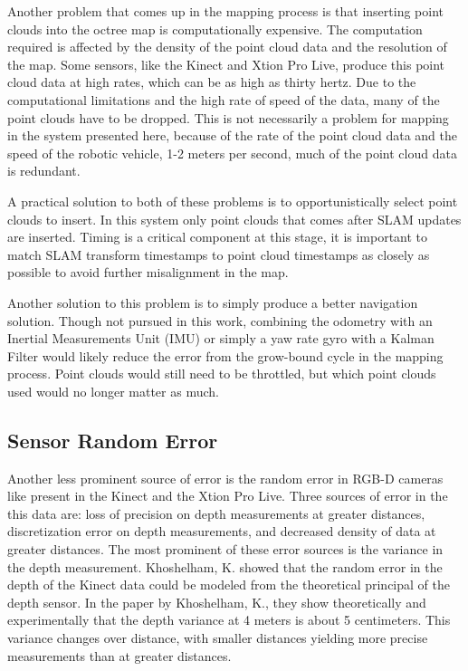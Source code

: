 \documentclass[12pt]{report}
\begin{document}
Another problem that comes up in the mapping process is that inserting point clouds into the octree map is computationally expensive.  The computation required is affected by the density of the point cloud data and the resolution of the map.  Some sensors, like the Kinect and Xtion Pro Live, produce this point cloud data at high rates, which can be as high as thirty hertz.  Due to the computational limitations and the high rate of speed of the data, many of the point clouds have to be dropped.  This is not necessarily a problem for mapping in the system presented here, because of the rate of the point cloud data and the speed of the robotic vehicle, 1-2 meters per second, much of the point cloud data is redundant.

A practical solution to both of these problems is to opportunistically select point clouds to insert.  In this system only point clouds that comes after SLAM updates are inserted.  Timing is a critical component at this stage, it is important to match SLAM transform timestamps to point cloud timestamps as closely as possible to avoid further misalignment in the map.

Another solution to this problem is to simply produce a better navigation solution.  Though not pursued in this work, combining the odometry with an Inertial Measurements Unit (IMU) or simply a yaw rate gyro with a Kalman Filter would likely reduce the error from the grow-bound cycle in the mapping process.  Point clouds would still need to be throttled, but which point clouds used would no longer matter as much.

\subsection{Sensor Random Error}
Another less prominent source of error is the random error in RGB-D cameras like present in the Kinect and the Xtion Pro Live.  Three sources of error in the this data are: loss of precision on depth measurements at greater distances, discretization error on depth measurements, and decreased density of data at greater distances.  The most prominent of these error sources is the variance in the depth measurement.  Khoshelham, K. showed that the random error in the depth of the Kinect data could be modeled from the theoretical principal of the depth sensor\cite{khoshelham2011accuracy}.  In the paper by Khoshelham, K., they show theoretically and experimentally that the depth variance at 4 meters is about 5 centimeters.  This variance changes over distance, with smaller distances yielding more precise measurements than at greater distances.
\end{document}
